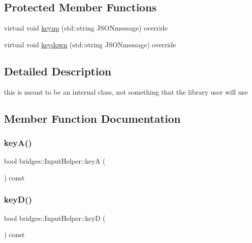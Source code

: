 \subsection*{Protected Member Functions}
\begin{DoxyCompactItemize}
\item 
virtual void \hyperlink{classbridges_1_1_input_helper_a55757d526340d939052cf1dca755262b}{keyup} (std\+::string J\+S\+O\+Nmessage) override
\item 
virtual void \hyperlink{classbridges_1_1_input_helper_a250df70ebe8470f1cb492c17a69c79d7}{keydown} (std\+::string J\+S\+O\+Nmessage) override
\end{DoxyCompactItemize}


\subsection{Detailed Description}
this is meant to be an internal class, not something that the library user will use 

\subsection{Member Function Documentation}
\mbox{\label{classbridges_1_1_input_helper_a1e438ddcf6a4a91aed6093229fb9d981}} 
\subsubsection{\texorpdfstring{key\+A()}{keyA()}}
{\footnotesize\ttfamily bool bridges\+::\+Input\+Helper\+::keyA (\begin{DoxyParamCaption}{ }\end{DoxyParamCaption}) const\hspace{0.3cm}{\ttfamily [inline]}}

\mbox{\label{classbridges_1_1_input_helper_a23d78e9b8b70b27514ec0ab891969d70}} 
\subsubsection{\texorpdfstring{key\+D()}{keyD()}}
{\footnotesize\ttfamily bool bridges\+::\+Input\+Helper\+::keyD (\begin{DoxyParamCaption}{ }\end{DoxyParamCaption}) const\hspace{0.3cm}{\ttfamily [inline]}}

